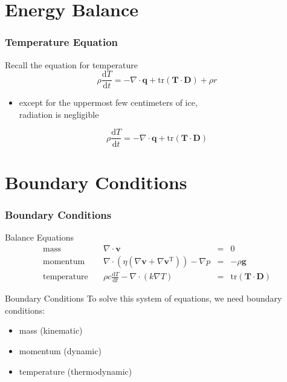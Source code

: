 \documentclass[hide notes,intlimits]{beamer}
\begin{document}
\section{Energy Balance}

\begin{frame}
  \frametitle{Temperature Equation}
  Recall the equation for temperature
  \begin{equation}
    \rho\frac{\text{d} T}{\text{d} t} = - \nabla \cdot \mathbf{q} + \text{tr} \left(\mathbf{T}\cdot\mathbf{D}\right) + \rho r
  \end{equation}
  \begin{itemize}
  \item except for the uppermost few centimeters of ice,\\ radiation is negligible
 \end{itemize}
  \begin{equation}
    \rho\frac{\text{d} T}{\text{d} t} = - \nabla \cdot \mathbf{q} + \text{tr} \left(\mathbf{T}\cdot\mathbf{D}\right)
  \end{equation}
\end{frame}



\section{Boundary Conditions}


\begin{frame}
  \frametitle{Boundary Conditions}
  \begin{block}{Balance Equations}
    \begin{equation*}
      \begin{array}{lrcl}
        \text{mass} \quad &  \nabla \cdot \mathbf{v}  & = & 0\\[.25em]
        \text{momentum} \quad &  \nabla \cdot \left(\eta\left(\nabla \mathbf{v} + \nabla \mathbf{v}^{\text{T}}\right)\right)- \nabla p & = &  -\rho\mathbf{g} \\[.25em]
        \text{temperature} \quad & \rho c\frac{\text{d} T}{\text{d} t} - \nabla \cdot \left(k \nabla T\right) & = &  \text{tr} \left(\mathbf{T}\cdot\mathbf{D}\right) 
      \end{array}
    \end{equation*}
  \end{block}
 \begin{block}{Boundary Conditions} 
  To solve this system of equations, we need boundary conditions:
  \begin{itemize}
  \item mass (kinematic)
  \item momentum (dynamic)
  \item temperature (thermodynamic)
  \end{itemize}
  \end{block}
\end{frame}
\end{document}

